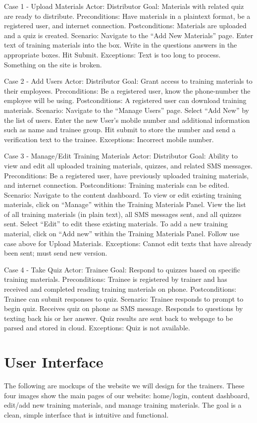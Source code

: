 Case 1 - Upload Materials
Actor: Distributor
Goal: Materials with related quiz are ready to distribute.
Preconditions: Have materials in a plaintext format, be a registered user, and internet connection.
Postconditions: Materials are uploaded and a quiz is created.
Scenario: 
Navigate to the “Add New Materials” page.
Enter text of training materials into the box.
Write in the questions answers in the appropriate boxes.
Hit Submit.
Exceptions:
Text is too long to process.
Something on the site is broken.

Case 2 - Add Users
Actor: Distributor
Goal: Grant access to training materials to their employees.
Preconditions: Be a registered user, know the phone-number the employee will be using.
Postconditions: A registered user can download training materials.
Scenario:
Navigate to the “Manage Users” page.
Select “Add New” by the list of users.
Enter the new User’s mobile number and additional information such as name and trainee group.
Hit submit to store the number and send a verification text to the trainee.
Exceptions: 
Incorrect mobile number.

Case 3 - Manage/Edit Training Materials
Actor: Distributor
Goal: Ability to view and edit all uploaded training materials, quizzes, and related SMS messages.
Preconditions: Be a registered user, have previously uploaded training materials, and internet connection.
Postconditions: Training materials can be edited.
Scenario: 
Navigate to the content dashboard.
To view or edit existing training materials, click on “Manage” within the Training Materials Panel.
View the list of all training materials (in plain text), all SMS messages sent, and all quizzes sent.
Select “Edit” to edit these existing materials.
To add a new training material, click on “Add new” within the Training Materials Panel.
Follow use case above for Upload Materials.
Exceptions:
Cannot edit texts that have already been sent; must send new version.

Case 4 - Take Quiz
Actor: Trainee
Goal: Respond to quizzes based on specific training materials.
Preconditions: Trainee is registered by trainer and has received and completed reading training materials on phone.
Postconditions: Trainee can submit responses to quiz.
Scenario: 
Trainee responds to prompt to begin quiz.
Receives quiz on phone as SMS message.
Responds to questions by texting back his or her answer.
Quiz results are sent back to webpage to be parsed and stored in cloud.
Exceptions:
Quiz is not available.


\section{User Interface}
The following are mockups of the website we will design for the trainers. These four images show the main pages of our website: home/login, content dashboard, edit/add new training materials, and manage training materials. The goal is a clean, simple interface that is intuitive and functional.

